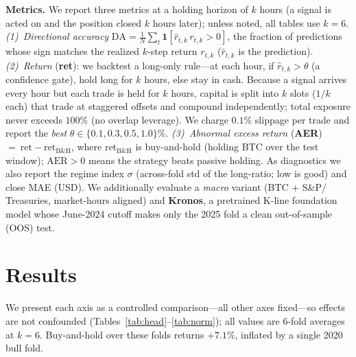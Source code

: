 \documentclass[10pt]{article}
\begin{document}
\noindent\textbf{Metrics.} We report three metrics at a holding horizon of $k$ hours (a signal is
acted on and the position closed $k$ hours later); unless noted, all tables use $k{=}6$.
\emph{(1)~Directional accuracy} $\mathrm{DA}=\frac1N\sum_t\mathbf{1}[\hat r_{t,k}\,r_{t,k}>0]$,
the fraction of predictions whose sign matches the realized $k$-step return $r_{t,k}$
($\hat r_{t,k}$ is the prediction).
\emph{(2)~Return} (\textbf{ret}): we backtest a long-only rule---at each hour, if
$\hat r_{t,k}>\theta$ (a confidence gate), hold long for $k$ hours, else stay in cash. Because a
signal arrives every hour but each trade is held for $k$ hours, capital is split into $k$ slots
($1/k$ each) that trade at staggered offsets and compound independently; total exposure never
exceeds $100\%$ (no overlap leverage). We charge $0.1\%$ slippage per trade and report the
\emph{best} $\theta\!\in\!\{0.1,0.3,0.5,1.0\}\%$.
\emph{(3)~Abnormal excess return} (\textbf{AER})~$=\ \text{ret}-\text{ret}_{\text{B\&H}}$, where
$\text{ret}_{\text{B\&H}}$ is buy-and-hold (holding BTC over the test window); $\mathrm{AER}>0$
means the strategy beats passive holding.
As diagnostics we also report the regime index $\sigma$ (across-fold std of the long-ratio; low
is good) and close MAE (USD). We additionally evaluate a \emph{macro} variant (BTC + S\&P/
Treasuries, market-hours aligned) and \textbf{Kronos}, a pretrained K-line foundation model whose
June-2024 cutoff makes only the 2025 fold a clean out-of-sample (OOS) test.

\section{Results}
We present each axis as a controlled comparison---all other axes fixed---so effects are not
confounded (Tables~\ref{tab:head}--\ref{tab:norm}); all values are 6-fold averages at $k{=}6$.
Buy-and-hold over these folds returns ${+}7.1\%$, inflated by a single 2020 bull fold.
\end{document}
